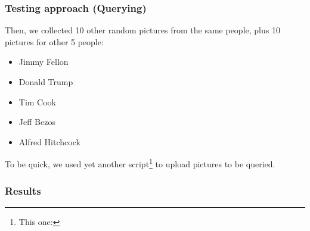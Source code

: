 \begin{frame} \frametitle{Testing approach (Querying)}
	
	Then, we collected 10 other random pictures from the same 
	people, plus 10 pictures for other 5 people:
	
	\begin{itemize}
		\item Jimmy Fellon
		\item Donald Trump
		\item Tim Cook
		\item Jeff Bezos
		\item Alfred Hitchcock
	\end{itemize}
	
	To be quick, we used yet another script\footnote{This one: } to upload
	pictures to be queried. 

\end{frame}

\begin{frame} \frametitle{Results}

	

\end{frame}
